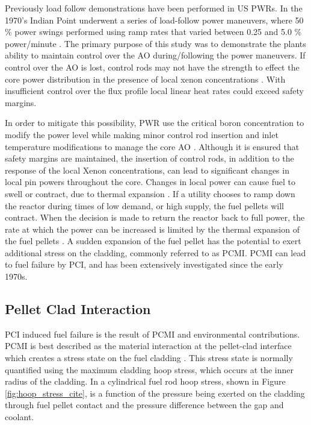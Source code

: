 \documentclass[edeposit,fullpage,11pt]{uiucthesis2009}
\begin{document}
Previously load follow demonstrations have been performed in \gls{US} \gls{PWR}s.
In the 1970's Indian Point underwent a series of load-follow power maneuvers, where 50 \% power swings performed using ramp rates that varied between 0.25 and 5.0 \% power/minute \cite{sipush_load-follow_1976}.
The primary purpose of this study was to demonstrate the plants ability to maintain control over the \gls{AO} during/following the power maneuvers. 
If control over the \gls{AO} is lost, control rods may not have the strength to effect the core power distribution in the presence of local xenon concentrations \cite{sipush_load-follow_1976}.
With insufficient control over the flux profile local linear heat rates could exceed safety margins.

In order to mitigate this possibility, \gls{PWR} use the critical boron concentration to modify the power level while making minor control rod insertion and inlet temperature modifications to manage the core \gls{AO} \cite{meyer_improved_1978}.  
Although it is ensured that safety margins are maintained, the insertion of control rods, in addition to the response of the local Xenon concentrations, can lead to significant changes in local pin powers throughout the core.
Changes in local power can cause fuel to swell or contract, due to thermal expansion \cite{gartner_power_1984}. %
If a utility chooses to ramp down the reactor during times of low demand, or high supply, the fuel pellets will contract.
When the decision is made to return the reactor back to full power, the rate at which the power can be increased is limited by the thermal expansion of the fuel pellets \cite{gartner_power_1984}.
A sudden expansion of the fuel pellet has the potential to exert additional stress on the cladding, commonly referred to as \gls{PCMI}.
\gls{PCMI} can lead to fuel failure by \gls{PCI}, and has been extensively investigated since the early 1970s.

\subsection{Pellet Clad Interaction}

\gls{PCI} induced fuel failure is the result of \gls{PCMI} and environmental contributions.
\gls{PCMI} is best described as the material interaction at the pellet-clad interface which creates a stress state on the fuel cladding \cite{kennard_pci_2016}.
This stress state is normally quantified using the maximum cladding hoop stress, which occurs at the inner radius of the cladding.
In a cylindrical fuel rod hoop stress, shown in Figure \ref{fig:hoop_stress_cite}, is a function of the pressure being exerted on the cladding through fuel pellet contact and the pressure difference between the gap and coolant.
\end{document}
